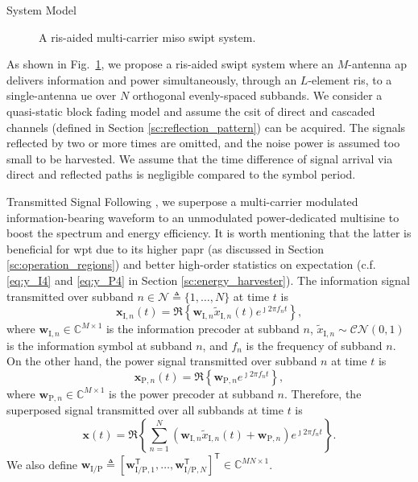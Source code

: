 \begin{section}{System Model}
	\begin{figure}[H]
		\centering
		\def\svgwidth{0.7\columnwidth}
		
		\caption{A \gls{ris}-aided multi-carrier \gls{miso} \gls{swipt} system.}
		\label{fg:system}
	\end{figure}

	As shown in Fig.~\ref{fg:system}, we propose a \gls{ris}-aided \gls{swipt} system where an $M$-antenna \gls{ap} delivers information and power simultaneously, through an $L$-element \gls{ris}, to a single-antenna \gls{ue} over $N$ orthogonal evenly-spaced subbands. We consider a quasi-static block fading model and assume the \gls{csit} of direct and cascaded channels (defined in Section \ref{sc:reflection_pattern}) can be acquired. The signals reflected by two or more times are omitted, and the noise power is assumed too small to be harvested.
	We assume that the time difference of signal arrival via direct and reflected paths is negligible compared to the symbol period.


	\begin{subsection}{Transmitted Signal}
		Following \cite{Clerckx2018b}, we superpose a multi-carrier modulated information-bearing waveform to an unmodulated power-dedicated multisine to boost the spectrum and energy efficiency.
		It is worth mentioning that the latter is beneficial for \gls{wpt} due to its higher \gls{papr} (as discussed in Section \ref{sc:operation_regions}) and better high-order statistics on expectation (c.f. \eqref{eq:y_I4} and \eqref{eq:y_P4} in Section \ref{sc:energy_harvester}).
		The information signal transmitted over subband $n \in \mathcal{N} \triangleq \{1, \dots, N\}$ at time $t$ is
		\begin{equation}
			\mathbf{x}_{\mathrm{I},n}(t) = \Re\left\{\mathbf{w}_{\mathrm{I},n} \tilde{x}_{\mathrm{I},n}(t) e^{\jmath 2{\pi}{f_n}{t}}\right\},
		\end{equation}
		where $\mathbf{w}_{\mathrm{I},n} \in \mathbb{C}^{M \times 1}$ is the information precoder at subband $n$, $\tilde{x}_{\mathrm{I},n}\sim\mathcal{CN}(0,1)$ is the information symbol at subband $n$, and $f_n$ is the frequency of subband $n$. On the other hand, the power signal transmitted over subband $n$ at time $t$ is
		\begin{equation}
			\mathbf{x}_{\mathrm{P},n}(t) = \Re\left\{\mathbf{w}_{\mathrm{P},n} e^{\jmath 2{\pi}{f_n}{t}}\right\},
		\end{equation}
		where $\mathbf{w}_{\mathrm{P},n} \in \mathbb{C}^{M \times 1}$ is the power precoder at subband $n$. Therefore, the superposed signal transmitted over all subbands at time $t$ is
		\begin{equation}
			\mathbf{x}(t) = \Re{\left\{\sum_{n=1}^N(\mathbf{w}_{\mathrm{I},n}\tilde{x}_{\mathrm{I},n}(t)+\mathbf{w}_{\mathrm{P},n}){e^{\jmath 2{\pi}{f_n}{t}}}\right\}}.
		\end{equation}
		We also define $\mathbf{w}_{\mathrm{I/P}} \triangleq [\mathbf{w}_{\mathrm{I/P},1}^\mathsf{T},\dots,\mathbf{w}_{\mathrm{I/P},N}^\mathsf{T}]^\mathsf{T} \in \mathbb{C}^{MN \times 1}$.
	\end{subsection}



\end{section}
